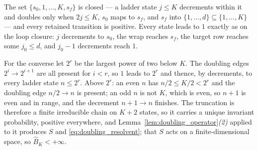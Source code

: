 The set $\{s_0,1,\dots,K,s_f\}$ is closed --- a ladder state $j\leq K$ decrements within it and
doubles only when $2j\leq K$, $s_0$ maps to $s_f$, and $s_f$ into $\{1,\dots,d\}\subseteq
\{1,\dots,K\}$ --- and every retained transition is positive. Every state leads to $1$ exactly
as on the loop closure: $j$ decrements to $s_0$, the wrap reaches $s_f$, the target row reaches
some $j_0\leq d$, and $j_0-1$ decrements reach $1$.

For the converse let $2^{r}$ be the largest power of two below $K$. The doubling edges
$2^{i}\rightarrow2^{i+1}$ are all present for $i<r$, so $1$ leads to $2^{r}$ and thence, by
decrements, to every ladder state $n\leq2^{r}$. Above $2^{r}$: an even $n$ has $n/2\leq
K/2<2^{r}$ and the doubling edge $n/2\rightarrow n$ is present; an odd $n$ is not $K$, which is
even, so $n+1$ is even and in range, and the decrement $n+1\rightarrow n$ finishes. The
truncation is therefore a finite irreducible chain on $K+2$ states, so it carries a unique
invariant probability, positive everywhere, and
Lemma~\ref{lem:doubling_operator}\emph{(2)} applied to it produces $S$ and
\eqref{eq:doubling_resolvent}; that $S$ acts on a finite-dimensional space, so
$\widehat B_K<+\infty$.
